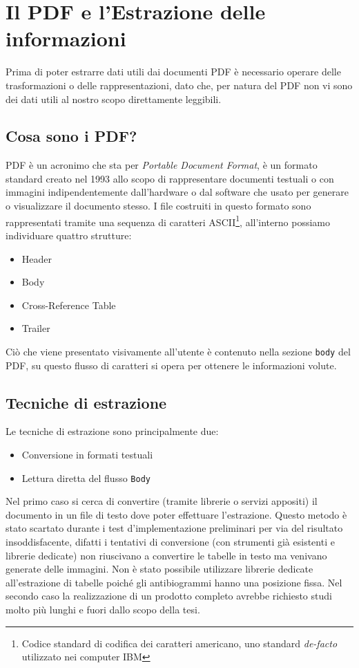 \chapter{Il PDF e l'Estrazione delle informazioni}
Prima di poter estrarre dati utili dai documenti PDF è necessario operare delle trasformazioni o delle rappresentazioni, dato che, per natura del PDF non vi sono dei dati utili al nostro scopo direttamente leggibili.

\section{Cosa sono i PDF?}
PDF è un acronimo che sta per \textit{Portable Document Format}, è un formato standard creato nel 1993 allo scopo di rappresentare documenti testuali o con immagini indipendentemente dall'hardware o dal software che usato per generare o visualizzare il documento stesso. I file costruiti in questo formato sono rappresentati tramite una sequenza di caratteri ASCII\footnote{Codice standard di codifica dei caratteri americano, uno standard \textit{de-facto} utilizzato nei computer IBM}, all'interno possiamo individuare quattro strutture:

\begin{itemize}
	\item Header
	\item Body
	\item Cross-Reference Table
	\item Trailer
\end{itemize}
Ciò che viene presentato visivamente all'utente è contenuto nella sezione \texttt{body} del PDF, su questo flusso di caratteri si opera per ottenere le informazioni volute.
\newpage
\section{Tecniche di estrazione}
Le tecniche di estrazione sono principalmente due:
\begin{itemize}
	\item Conversione in formati testuali
	\item Lettura diretta del flusso \texttt{Body}
\end{itemize}

Nel primo caso si cerca di convertire (tramite librerie o servizi appositi) il documento in un file di testo dove poter effettuare l'estrazione. Questo metodo è stato scartato durante i test d'implementazione preliminari per via del risultato insoddisfacente, difatti i tentativi di conversione (con strumenti già esistenti e librerie dedicate) non riuscivano a convertire le tabelle in testo ma venivano generate delle immagini. 
Non è stato possibile utilizzare librerie dedicate all'estrazione di tabelle poiché gli antibiogrammi hanno una posizione fissa.
Nel secondo caso la realizzazione di un prodotto completo avrebbe richiesto studi molto più lunghi e fuori dallo scopo della tesi.
